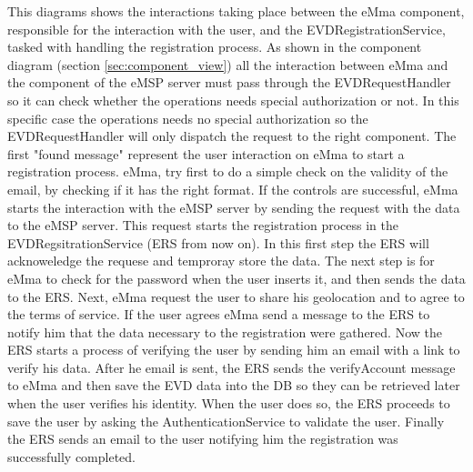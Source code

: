 This diagrams shows the interactions taking place between the eMma component, responsible for the interaction with the user, and the EVDRegistrationService, tasked with handling the registration process. As shown in the component diagram (section \ref{sec:component_view}) all the interaction between eMma and the component of the eMSP server must pass through the EVDRequestHandler so it can check whether the operations needs special authorization or not. In this specific case the operations needs no special authorization so the EVDRequestHandler will only dispatch the request to the right component. The first "found message" represent the user interaction on eMma to start a registration process. eMma, try first to do a simple check on the validity of the email, by checking if it has the right format. If the controls are successful, eMma starts the interaction with the eMSP server by sending the request with the data to the eMSP server. This request starts the registration process in the EVDRegsitrationService (ERS from now on). In this first step the ERS will acknoweledge the requese and temproray store the data. The next step is for eMma to check for the password when the user inserts it, and then sends the data to the ERS. Next, eMma request the user to share his geolocation and to agree to the terms of service. If the user agrees eMma send a message to the ERS to notify him that the data necessary to the registration were gathered. Now the ERS starts a process of verifying the user by sending him an email with a link to verify his data. After he email is sent, the ERS sends the verifyAccount message to eMma and then save the EVD data into the DB so they can be retrieved later when the user verifies his identity. When the user does so, the ERS proceeds to save the user by asking the AuthenticationService to validate the user. Finally the ERS sends an email to the user notifying him the registration was successfully completed.

